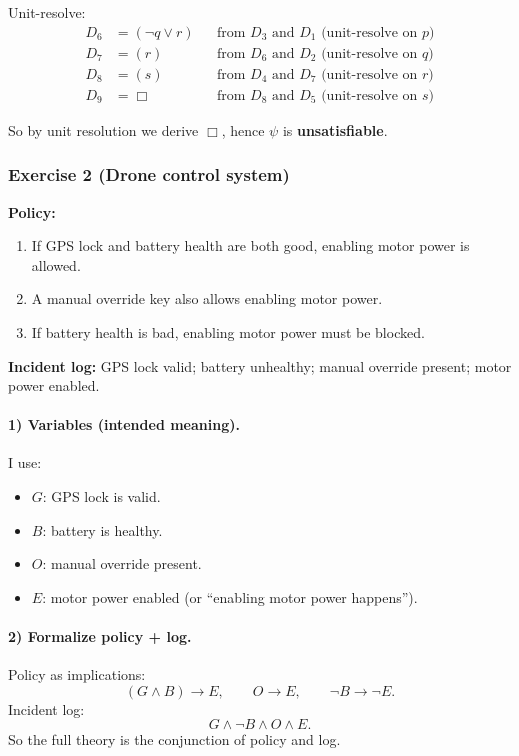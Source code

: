 \documentclass{article}
\theoremstyle{theorem}
\theoremstyle{definition}
\theoremstyle{remark}
\begin{document}
Unit-resolve:
\begin{align*}
D_6&=(\neg q \lor r) &&\text{from } D_3 \text{ and } D_1 \text{ (unit-resolve on } p\text{)}\\
D_7&=(r)            &&\text{from } D_6 \text{ and } D_2 \text{ (unit-resolve on } q\text{)}\\
D_8&=(s)            &&\text{from } D_4 \text{ and } D_7 \text{ (unit-resolve on } r\text{)}\\
D_9&=\Box           &&\text{from } D_8 \text{ and } D_5 \text{ (unit-resolve on } s\text{)}
\end{align*}

So by unit resolution we derive $\Box$, hence $\psi$ is \textbf{unsatisfiable}.

\subsubsection*{Exercise 2 (Drone control system)}
\textbf{Policy:}
\begin{enumerate}
  \item If GPS lock and battery health are both good, enabling motor power is allowed.
  \item A manual override key also allows enabling motor power.
  \item If battery health is bad, enabling motor power must be blocked.
\end{enumerate}

\textbf{Incident log:} GPS lock valid; battery unhealthy; manual override present; motor power enabled.

\paragraph{1) Variables (intended meaning).}
I use:
\begin{itemize}
  \item $G$: GPS lock is valid.
  \item $B$: battery is healthy.
  \item $O$: manual override present.
  \item $E$: motor power enabled (or ``enabling motor power happens'').
\end{itemize}

\paragraph{2) Formalize policy + log.}
Policy as implications:
\[
(G \land B) \to E,\qquad O \to E,\qquad \neg B \to \neg E.
\]
Incident log:
\[
G \land \neg B \land O \land E.
\]
So the full theory is the conjunction of policy and log.
\end{document}
